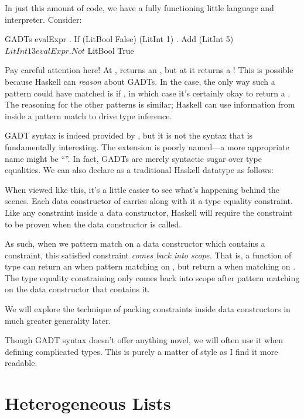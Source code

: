 \documentclass[book.tex]{subfiles}
\begin{document}

In just this amount of code, we have a fully functioning little language and
interpreter. Consider:

\begin{dorepl}{GADTs}
evalExpr . If (LitBool False) (LitInt 1) . Add (LitInt 5) $ LitInt 13
evalExpr . Not $ LitBool True
\end{dorepl}

Pay careful attention here! At ,  returns an , but
at  it returns a ! This is possible because Haskell can
\emph{reason} about GADTs. In the  case, the only way such a pattern
could have matched is if , in which case it's certainly okay to
return a . The reasoning for the other patterns is similar; Haskell can
use information from inside a pattern match to drive type inference.

GADT syntax is indeed provided by , but it is not the syntax that is
fundamentally interesting. The extension is poorly named---a more appropriate
name might be ``''. In fact, GADTs are merely syntactic
sugar over type equalities. We can also declare  as a traditional
Haskell datatype as follows:


When viewed like this, it's a little easier to see what's happening behind the
scenes. Each data constructor of  carries along with it a
type equality constraint. Like any constraint inside a data constructor, Haskell
will require the constraint to be proven when the data constructor is called.

As such, when we pattern match on a data constructor which contains a
constraint, this satisfied constraint \emph{comes back into scope.} That is, a
function of type  can return an  when pattern matching
on , but return a  when matching on . The type
equality constraining  only comes back into scope after pattern matching
on the data constructor that contains it.

We will explore the technique of packing constraints inside data constructors
in much greater generality later.

Though GADT syntax doesn't offer anything novel, we will often use it when
defining complicated types. This is purely a matter of style as I find it more
readable.


\section{Heterogeneous Lists}
\end{document}
